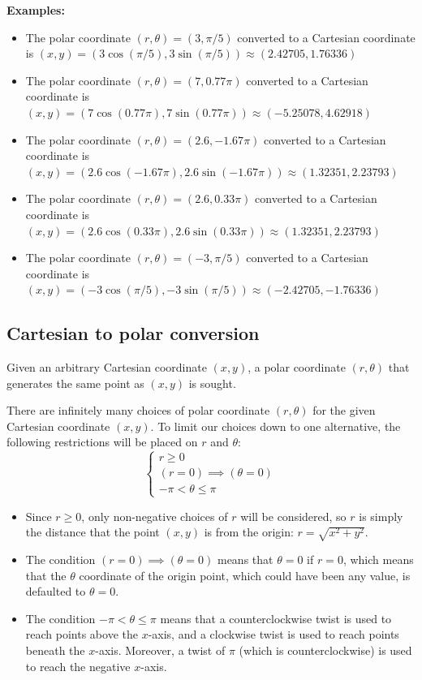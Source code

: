\documentclass{article}
\begin{document}
\textbf{Examples:}
\begin{itemize}
\item The polar coordinate \((r, \theta) = (3, \pi/5)\) converted to a Cartesian coordinate is \((x, y) = (3\cos(\pi/5), 3\sin(\pi/5)) \approx (2.42705, 1.76336)\)
\item The polar coordinate \((r, \theta) = (7, 0.77\pi)\) converted to a Cartesian coordinate is \((x, y) = (7\cos(0.77\pi), 7\sin(0.77\pi)) \approx (-5.25078, 4.62918)\)
\item The polar coordinate \((r, \theta) = (2.6, -1.67\pi)\) converted to a Cartesian coordinate is \\ \((x, y) = (2.6\cos(-1.67\pi), 2.6\sin(-1.67\pi)) \approx (1.32351, 2.23793)\)
\item The polar coordinate \((r, \theta) = (2.6, 0.33\pi)\) converted to a Cartesian coordinate is \\ \((x, y) = (2.6\cos(0.33\pi), 2.6\sin(0.33\pi)) \approx (1.32351, 2.23793)\)
\item The polar coordinate \((r, \theta) = (-3, \pi/5)\) converted to a Cartesian coordinate is \((x, y) = (-3\cos(\pi/5), -3\sin(\pi/5)) \approx (-2.42705, -1.76336)\)
\end{itemize}




\subsection*{Cartesian to polar conversion}

Given an arbitrary Cartesian coordinate \((x, y)\), a polar coordinate \((r, \theta)\) that generates the same point as \((x, y)\) is sought.

There are infinitely many choices of polar coordinate \((r,\theta)\) for the given Cartesian coordinate \((x,y)\). To limit our choices down to one alternative, the following restrictions will be placed on \(r\) and \(\theta\):
\[\left\{\begin{array}{c} r \geq 0 \\ (r = 0) \implies (\theta = 0) \\ -\pi < \theta \leq \pi \end{array}\right.\] 
\begin{itemize}
\item Since \(r \geq 0\), only non-negative choices of \(r\) will be considered, so \(r\) is simply the distance that the point \((x,y)\) is from the origin: \(r = \sqrt{x^2 + y^2}\). 
\item The condition \((r = 0) \implies (\theta = 0)\) means that \(\theta = 0\) if \(r = 0\), which means that the \(\theta\) coordinate of the origin point, which could have been any value, is defaulted to \(\theta = 0\). 
\item The condition \(-\pi < \theta \leq \pi\) means that a counterclockwise twist is used to reach points above the \(x\)-axis, and a clockwise twist is used to reach points beneath the \(x\)-axis. Moreover, a twist of \(\pi\) (which is counterclockwise) is used to reach the negative \(x\)-axis.
\end{itemize}
\end{document}
